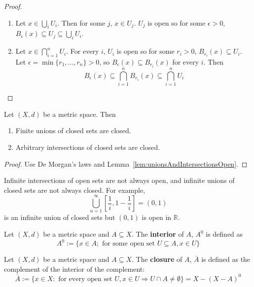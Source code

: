 \begin{proof}
	\hfill
	\begin{enumerate}
		\item Let $x \in \bigcup_{i} U_i$. Then for some $j$, $x \in U_j$. $U_j$ is open so for some $\epsilon > 0$, $B_{\epsilon} (x) \subseteq U_j \subseteq \bigcup_{i} U_i$.
		\item Let $x \in \bigcap_{i = 1}^n U_i$. For every $i$, $U_i$ is open so for some $r_i > 0$, $B_{r_i} (x) \subseteq U_i$. Let $\epsilon = \min \{ r_1, \ldots, r_n \} > 0$, so $B_{\epsilon}(x) \subseteq B_{r_i}(x)$ for every $i$. Then
		\[
			B_{\epsilon}(x) \subseteq \bigcap_{i = 1}^n B_{r_i}(x) \subseteq \bigcap_{i = 1}^n U_i
		\]
	\end{enumerate}
\end{proof}

\begin{corollary}
	Let $(X, d)$ be a metric space. Then
	\begin{enumerate}
		\item Finite unions of closed sets are closed.
		\item Arbitrary intersections of closed sets are closed.
	\end{enumerate}
\end{corollary}

\begin{proof}
	Use De Morgan's laws and Lemma~\ref{lem:unionsAndIntersectionsOpen}.
\end{proof}

\begin{remark}
	Infinite intersections of open sets are not always open, and infinite unions of closed sets are not always closed. For example,
	\[
		\bigcup_{n = 1}^{\infty} \left[ \frac{1}{i}, 1 - \frac{1}{i} \right] = (0, 1)
	\]
	is an infinite union of closed sets but $(0, 1)$ is open in $\mathbb{R}$.
\end{remark}

\begin{definition}
	Let $(X, d)$ be a metric space and $A \subseteq X$. The \textbf{interior} of $A$, $A^0$ is defined as
	\[
		A^0 := \{ x \in A; \text{ for some open set } U \subseteq A, x \in U \}
	\]
\end{definition}

\begin{definition}
	Let $(X, d)$ be a metric space and $A \subseteq X$. The \textbf{closure} of $A$, $\bar{A}$ is defined as the complement of the interior of the complement:
	\[
		\bar{A} := \{ x \in X: \text{ for every open set } U, x \in U \Longrightarrow U \cap A \ne \emptyset \} = X - {(X - A)}^0
	\]
\end{definition}

